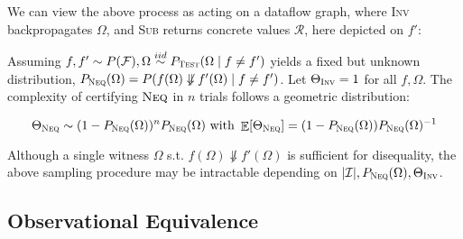 \documentclass[11pt]{article}
\begin{document}
    \noindent We can view the above process as acting on a dataflow graph, where \textsc{Inv} backpropagates $\Omega$, and \textsc{Sub} returns concrete values $\mathcal{R}$, here depicted on $f'$:

    \hspace{-30pt}\hspace{-20pt}

    \noindent Assuming $f, f' \sim P(\mathcal{F}), \Omega \overset{iid}{\sim} P_\textsc{Test}(\Omega \mid f \neq f')$ yields a fixed but unknown distribution, $P_\textsc{Neq}(\Omega) = P(f(\Omega)\not\Downarrow f'(\Omega) \mid f\neq f')$. Let $\Theta_\textsc{Inv} = 1$ for all $f, \Omega$. The complexity of certifying $\textsc{Neq}$ in $n$ trials follows a geometric distribution:

    \vspace{-10pt}$$\Theta_\textsc{Neq} \sim (1 - P_\textsc{Neq}(\Omega))^nP_\textsc{Neq}(\Omega) \text{ with } \mathop{\mathbb{E}}[\Theta_\textsc{Neq}] = (1-P_\textsc{Neq}(\Omega))P_\textsc{Neq}(\Omega)^{-1}$$

    \noindent Although a single witness $\Omega$ s.t. $f(\Omega) \not\Downarrow f'(\Omega)$ is sufficient for disequality, the above sampling procedure may be intractable depending on $|\mathcal{I}|, P_\textsc{Neq}(\Omega), \Theta_{\textsc{Inv}}$.





    \pagebreak\subsection{Observational Equivalence}
\end{document}
